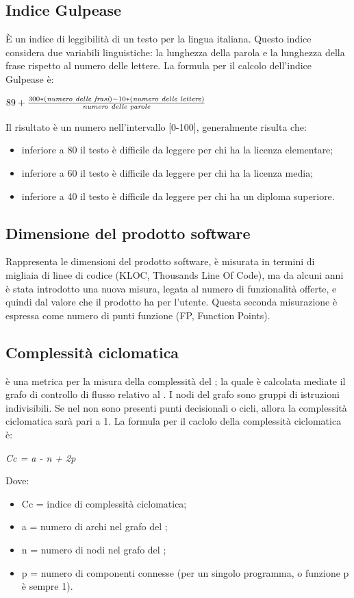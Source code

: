   \subsection{Indice Gulpease}
  È un indice di leggibilità di un testo per la lingua italiana.
  Questo indice considera due variabili linguistiche: la lunghezza della parola e la lunghezza della frase rispetto al numero delle lettere.
  La formula per il calcolo dell'indice Gulpease è:
  \begin{center}
    \( 89+\frac{300 * (\emph{numero delle frasi}) - 10 * (\emph{numero delle lettere})}{\emph{numero delle parole}} \)
  \end{center}
  Il risultato è un numero nell'intervallo [0-100], generalmente risulta che:
  \begin{itemize}
    \item inferiore a 80 il testo è difficile da leggere per chi ha la licenza elementare;
    \item inferiore a 60 il testo è difficile da leggere per chi ha la licenza media;
    \item inferiore a 40 il testo è difficile da leggere per chi ha un diploma superiore.
  \end{itemize}

  \subsection{Dimensione del prodotto software}
  Rappresenta le dimensioni del prodotto software, è misurata in termini di migliaia di linee di codice (KLOC, Thousands Line Of Code),
  ma da alcuni anni è stata introdotto una nuova misura, legata al numero di funzionalità offerte, e quindi dal valore che il prodotto ha per l’utente.
  Questa seconda misurazione è espressa come numero di punti funzione (FP, Function Points).

  \subsection{Complessità ciclomatica}
  è una metrica per la misura della complessità del ;
  la quale è calcolata mediate il grafo di controllo di flusso relativo al .
  I nodi del grafo sono gruppi di istruzioni indivisibili. Se nel  non sono
  presenti punti decisionali o cicli, allora la complessità ciclomatica sarà pari a 1. La formula per il
  caclolo della complessità ciclomatica è:
  \begin{center}
    \emph{Cc = a - n + 2p}
  \end{center}
  Dove:
  \begin{itemize}
    \item Cc = indice di complessità ciclomatica;
    \item a = numero di archi nel grafo del ;
    \item n = numero di nodi nel grafo del ;
    \item p = numero di componenti connesse (per un singolo programma,  o funzione p è sempre 1).
  \end{itemize}

